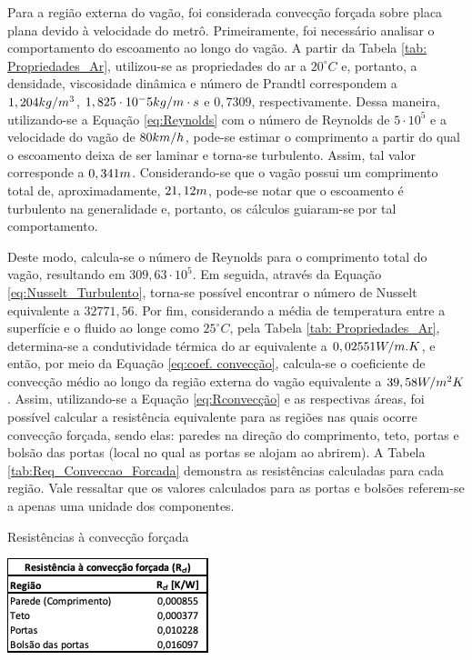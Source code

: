 \documentclass[acronym,symbols,table]{fei}
\begin{document}
Para a região externa do vagão, foi considerada convecção forçada sobre placa plana devido à velocidade do metrô. Primeiramente, foi necessário analisar o comportamento do escoamento ao longo do vagão. A partir da Tabela \ref{tab: Propriedades_Ar}, utilizou-se as propriedades do ar a $20^\circ C$ e, portanto, a densidade, viscosidade dinâmica e número de Prandtl correspondem a $1,204 \space kg/m^3$, $1,825 \cdot 10^-5 \space kg/m \cdot s$ e $0,7309$, respectivamente. Dessa maneira, utilizando-se a Equação \ref{eq:Reynolds} com o número de Reynolds de $5 \cdot 10^5$ e a velocidade do vagão de $80 \space km/h$, pode-se estimar o comprimento a partir do qual o escoamento deixa de ser laminar e torna-se turbulento. Assim, tal valor corresponde a $0,341 \space m$. Considerando-se que o vagão possui um comprimento total de, aproximadamente, $21,12 \space m$, pode-se notar que o escoamento é turbulento na generalidade e, portanto, os cálculos guiaram-se por tal comportamento.

Deste modo, calcula-se o número de Reynolds para o comprimento total do vagão, resultando em $309,63 \cdot 10^5$. Em seguida, através da Equação \ref{eq:Nusselt_Turbulento}, torna-se possível encontrar o número de Nusselt equivalente a $32771,56$. Por fim, considerando a média de temperatura entre a superfície e o fluido ao longe como $25^\circ C$, pela Tabela \ref{tab: Propriedades_Ar}, determina-se a condutividade térmica do ar equivalente a $0,02551 \space W/m.K$, e então, por meio da Equação \ref{eq:coef. convecção}, calcula-se o coeficiente de convecção médio ao longo da região externa do vagão equivalente a $39,58 \space W/m^2 K$. Assim, utilizando-se a Equação \ref{eq:Rconvecção} e as respectivas áreas, foi possível calcular a resistência equivalente para as regiões nas quais ocorre convecção forçada, sendo elas: paredes na direção do comprimento, teto, portas e bolsão das portas (local no qual as portas se alojam ao abrirem). A Tabela \ref{tab:Req_Conveccao_Forcada} demonstra as resistências calculadas para cada região. Vale ressaltar que os valores calculados para as portas e bolsões referem-se a apenas uma unidade dos componentes. 

\begin{table}[!htb]
 \centering
    \caption{Resistências à convecção forçada}
    \includegraphics[width=0.4\linewidth]{Tabelas/Req_Conveccao_Forcada.png}
    \label{tab:Req_Conveccao_Forcada}
\end{table}
\end{document}
